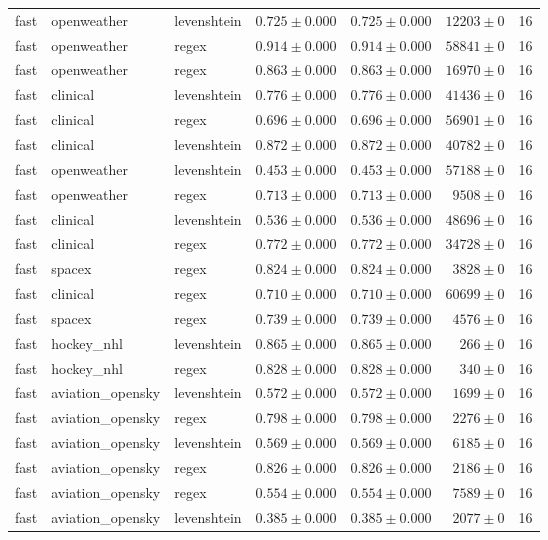 \begin{table}[htbp]
\begin{tabular}{l l l r r r r}
fast & openweather & levenshtein & $0.725\pm0.000$ & $0.725\pm0.000$ & $12203\pm0$ & 16 \\
fast & openweather & regex & $0.914\pm0.000$ & $0.914\pm0.000$ & $58841\pm0$ & 16 \\
fast & openweather & regex & $0.863\pm0.000$ & $0.863\pm0.000$ & $16970\pm0$ & 16 \\
fast & clinical & levenshtein & $0.776\pm0.000$ & $0.776\pm0.000$ & $41436\pm0$ & 16 \\
fast & clinical & regex & $0.696\pm0.000$ & $0.696\pm0.000$ & $56901\pm0$ & 16 \\
fast & clinical & levenshtein & $0.872\pm0.000$ & $0.872\pm0.000$ & $40782\pm0$ & 16 \\
fast & openweather & levenshtein & $0.453\pm0.000$ & $0.453\pm0.000$ & $57188\pm0$ & 16 \\
fast & openweather & regex & $0.713\pm0.000$ & $0.713\pm0.000$ & $9508\pm0$ & 16 \\
fast & clinical & levenshtein & $0.536\pm0.000$ & $0.536\pm0.000$ & $48696\pm0$ & 16 \\
fast & clinical & regex & $0.772\pm0.000$ & $0.772\pm0.000$ & $34728\pm0$ & 16 \\
fast & spacex & regex & $0.824\pm0.000$ & $0.824\pm0.000$ & $3828\pm0$ & 16 \\
fast & clinical & regex & $0.710\pm0.000$ & $0.710\pm0.000$ & $60699\pm0$ & 16 \\
fast & spacex & regex & $0.739\pm0.000$ & $0.739\pm0.000$ & $4576\pm0$ & 16 \\
fast & hockey\_nhl & levenshtein & $0.865\pm0.000$ & $0.865\pm0.000$ & $266\pm0$ & 16 \\
fast & hockey\_nhl & regex & $0.828\pm0.000$ & $0.828\pm0.000$ & $340\pm0$ & 16 \\
fast & aviation\_opensky & levenshtein & $0.572\pm0.000$ & $0.572\pm0.000$ & $1699\pm0$ & 16 \\
fast & aviation\_opensky & regex & $0.798\pm0.000$ & $0.798\pm0.000$ & $2276\pm0$ & 16 \\
fast & aviation\_opensky & levenshtein & $0.569\pm0.000$ & $0.569\pm0.000$ & $6185\pm0$ & 16 \\
fast & aviation\_opensky & regex & $0.826\pm0.000$ & $0.826\pm0.000$ & $2186\pm0$ & 16 \\
fast & aviation\_opensky & regex & $0.554\pm0.000$ & $0.554\pm0.000$ & $7589\pm0$ & 16 \\
fast & aviation\_opensky & levenshtein & $0.385\pm0.000$ & $0.385\pm0.000$ & $2077\pm0$ & 16 \\

\end{tabular}
\end{table}
